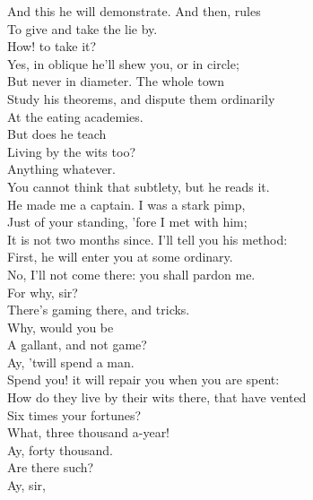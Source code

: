 \documentclass[a4paper,oneside]{memoir}
\begin{document}
\begin{drama*}
And this he will demonstrate. And then, rules\\
To give and take the lie by.\\
\kastrilspeaks {} How! to take it?\\
\facespeaks Yes, in oblique he'll shew you, or in circle;\\
But never in diameter. The whole town\\
Study his theorems, and dispute them ordinarily\\
At the eating academies.\\
\kastrilspeaks {} But does he teach\\
Living by the wits too?\\
\facespeaks {} Anything whatever.\\
You cannot think that subtlety, but he reads it.\\
He made me a captain. I was a stark pimp,\\
Just of your standing, 'fore I met with him;\\
It is not two months since. I'll tell you his method:\\
First, he will enter you at some ordinary.\\
\kastrilspeaks No, I'll not come there: you shall pardon me.\\
\facespeaks {} For why, sir?\\
\kastrilspeaks There's gaming there, and tricks.\\
\facespeaks {} Why, would you be\\
A gallant, and not game?\\
\kastrilspeaks {} Ay, 'twill spend a man.\\
\facespeaks Spend you! it will repair you when you are spent:\\
How do they live by their wits there, that have vented\\
Six times your fortunes?\\
\kastrilspeaks {} What, three thousand a-year!\\
\facespeaks Ay, forty thousand.\\
\kastrilspeaks {} Are there such?\\
\facespeaks {} Ay, sir,\\

\end{drama*}
\end{document}
